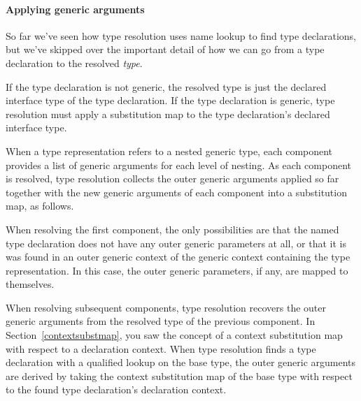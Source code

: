 \documentclass[../generics]{subfiles}
\begin{document}
\paragraph{Applying generic arguments} So far we've seen how type resolution uses name lookup to find type declarations, but we've skipped over the important detail of how we can go from a type declaration to the resolved \emph{type}.

If the type declaration is not generic, the resolved type is just the declared interface type of the type declaration. If the type declaration is generic, type resolution must apply a substitution map to the type declaration's declared interface type.

When a type representation refers to a nested generic type, each component provides a list of generic arguments for each level of nesting. As each component is resolved, type resolution collects the outer generic arguments applied so far together with the new generic arguments of each component into a substitution map, as follows.

When resolving the first component, the only possibilities are that the named type declaration does not have any outer generic parameters at all, or that it is was found in an outer generic context of the generic context containing the type representation. In this case, the outer generic parameters, if any, are mapped to themselves.

When resolving subsequent components, type resolution recovers the outer generic arguments from the resolved type of the previous component. In Section~\ref{contextsubstmap}, you saw the concept of a context substitution map with respect to a declaration context. When type resolution finds a type declaration with a qualified lookup on the base type, the outer generic arguments are derived by taking the context substitution map of the base type with respect to the found type declaration's declaration context. 
\end{document}
